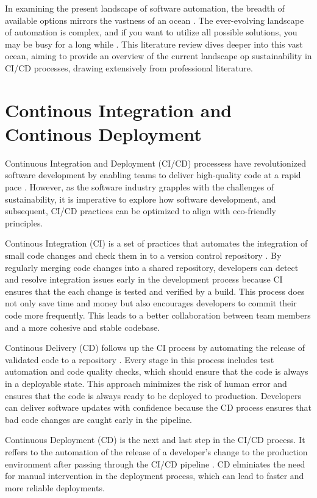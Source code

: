 In examining the present landscape of software automation, the breadth of available options mirrors the vastness of an ocean \autocite{King2019}.
The ever-evolving landscape of automation is complex, and if you want to utilize all possible solutions, you may be busy for a long while \autocite{King2019}.
This literature review dives deeper into this vast ocean, aiming to provide an overview of the current landscape op sustainability in CI/CD processes, drawing extensively from professional literature.

\section{Continous Integration and Continous Deployment}
Continuous Integration and Deployment (CI/CD) processess have revolutionized software development by enabling teams to deliver high-quality code at a rapid pace \autocite{Sacolick2024}.
However, as the software industry grapples with the challenges of sustainability, it is imperative to explore how software development, and subsequent, CI/CD practices can be optimized to align with eco-friendly principles.

Continous Integration (CI) is a set of practices that automates the integration of small code changes and check them in to a version control repository \autocite{Sacolick2024}.
By regularly merging code changes into a shared repository, developers can detect and resolve integration issues early in the development process because CI ensures that the each change is tested and verified by a build.
This process does not only save time and money but also encourages developers to commit their code more frequently.
This leads to a better collaboration between team members and a more cohesive and stable codebase.

Continous Delivery (CD) follows up the CI process by automating the release of validated code to a repository \autocite{Hat2023}.
Every stage in this process includes test automation and code quality checks, which should ensure that the code is always in a deployable state.
This approach minimizes the risk of human error and ensures that the code is always ready to be deployed to production. 
Developers can deliver software updates with confidence because the CD process ensures that bad code changes are caught early in the pipeline.

Continuous Deployment (CD) is the next and last step in the CI/CD process.
It reffers to the automation of the release of a developer's change to the production environment after passing through the CI/CD pipeline \autocite{Hat2023}.
CD elminiates the need for manual intervention in the deployment process, which can lead to faster and more reliable deployments.

